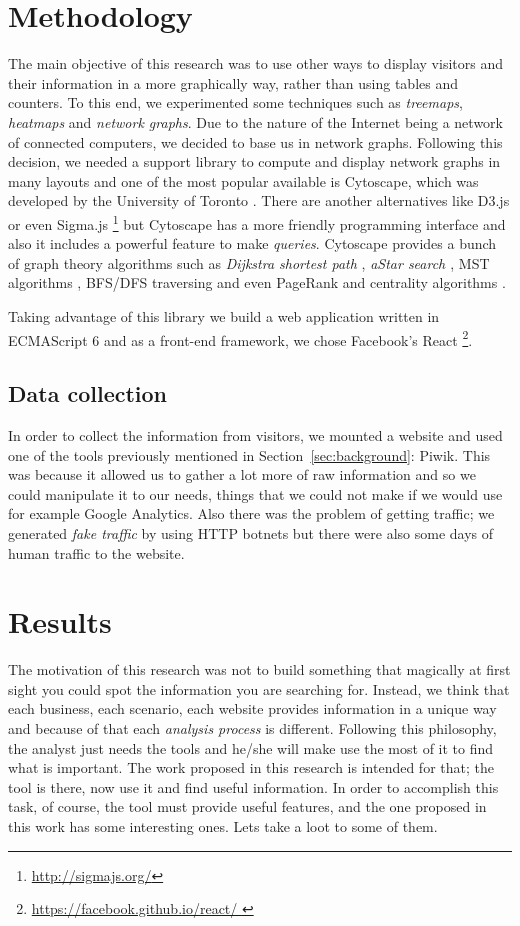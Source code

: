 \documentclass[preprint,12pt,3p]{elsarticle}
\begin{document}
\section{Methodology}
\label{sec:methodology}
The main objective of this research was to use other ways to display visitors and their information in a more graphically way, rather than using tables and counters. To this end, we experimented some techniques such as \textit{treemaps}, \textit{heatmaps} and \textit{network graphs}. Due to the nature of the Internet being a network of connected computers, we decided to base us in network graphs. Following this decision, we needed a support library to compute and display network graphs in many layouts and one of the most popular available is Cytoscape, which was developed by the University of Toronto \cite{Cytoscape}. There are another alternatives like D3.js \cite{D3js} or even Sigma.js \footnote{\url{http://sigmajs.org/}} but Cytoscape has a more friendly programming interface and also it includes a powerful feature to make \textit{queries}. Cytoscape provides a bunch of graph theory algorithms such as \textit{Dijkstra shortest path} \cite{K.Rohila2014}, \textit{aStar search \cite{Russell1995}}, MST algorithms \cite{Cormen2012}, BFS/DFS traversing and even PageRank \cite{Berkhin2005} and centrality algorithms \cite{Brandes2001}.

Taking advantage of this library we build a web application written in ECMAScript 6 and as a front-end framework, we chose Facebook's React \footnote{\url{ https://facebook.github.io/react/ }}.

\subsection{Data collection}
In order to collect the information from visitors, we mounted a website and used one of the tools previously mentioned in Section~\ref{sec:background}: Piwik. This was because it allowed us to gather a lot more of raw information and so we could manipulate it to our needs, things that we could not make if we would use for example Google Analytics. Also there was the problem of getting traffic; we generated \textit{fake traffic} by using HTTP botnets \cite{Acarali2016} but there were also some days of human traffic to the website.


\section{Results}
\label{sec:results}
The motivation of this research was not to build something that magically at first sight you could spot the information you are searching for. Instead, we think that each business, each scenario, each website provides information in a unique way and because of that each \textit{analysis process} is different. Following this philosophy, the analyst just needs the tools and he/she will make use the most of it to find what is important. The work proposed in this research is intended for that; the tool is there, now use it and find useful information.
In order to accomplish this task, of course, the tool must provide useful features, and the one proposed in this work has some interesting ones. Lets take a loot to some of them.
\end{document}
